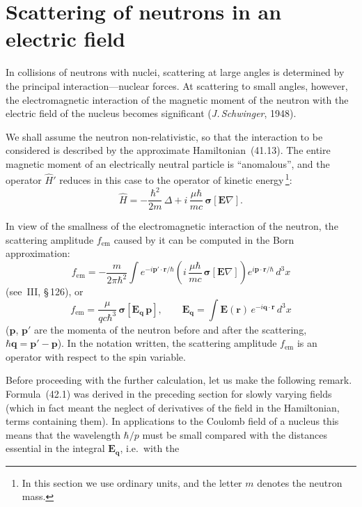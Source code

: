 \section{Scattering of neutrons in an electric field}

In collisions of neutrons with nuclei, scattering at large angles is determined by the principal interaction---nuclear forces. At scattering to small angles, however, the electromagnetic interaction of the magnetic moment of the neutron with the electric field of the nucleus becomes significant (\textit{J.\,Schwinger}, 1948).

We shall assume the neutron non-relativistic, so that the interaction to be considered is described by the approximate Hamiltonian~(41.13). The entire magnetic moment of an electrically neutral particle is ``anomalous'', and the operator $\widehat H'$ reduces in this case to the operator of kinetic energy\,\footnote{In this section we use ordinary units, and the letter $m$ denotes the neutron mass.}:
\begin{equation}
\widehat H = -\frac{\hbar^2}{2m}\,\Delta + i\,\frac{\mu\hbar}{mc}\,\boldsymbol{\sigma}[\mathbf{E}\nabla].
\tag{42.1}
\end{equation}

In view of the smallness of the electromagnetic interaction of the neutron, the scattering amplitude $f_{\mathrm{em}}$ caused by it can be computed in the Born approximation:
\begin{equation}
f_{\mathrm{em}} = -\frac{m}{2\pi\hbar^2}\int e^{-i\mathbf{p}'\cdot\mathbf{r}/\hbar}\!\left(i\,\frac{\mu\hbar}{mc}\,\boldsymbol{\sigma}[\mathbf{E}\nabla]\right)e^{i\mathbf{p}\cdot\mathbf{r}/\hbar}\,d^3x
\tag{42.2}
\end{equation}
(see~III, \S\,126), or
\[
f_{\mathrm{em}} = \frac{\mu}{qc\hbar^3}\,\boldsymbol{\sigma}[\mathbf{E}_\mathbf{q}\,\mathbf{p}],\qquad \mathbf{E}_\mathbf{q} = \int\mathbf{E}(\mathbf{r})\,e^{-i\mathbf{q}\cdot\mathbf{r}}\,d^3x
\]
($\mathbf{p}$, $\mathbf{p}'$ are the momenta of the neutron before and after the scattering, $\hbar\mathbf{q} = \mathbf{p}' - \mathbf{p}$). In the notation written, the scattering amplitude $f_{\mathrm{em}}$ is an operator with respect to the spin variable.

Before proceeding with the further calculation, let us make the following remark. Formula~(42.1) was derived in the preceding section for slowly varying fields (which in fact meant the neglect of derivatives of the field in the Hamiltonian, terms containing them). In applications to the Coulomb field of a nucleus this means that the wavelength $\hbar/p$ must be small compared with the distances essential in the integral $\mathbf{E}_\mathbf{q}$, i.e.\ with the

